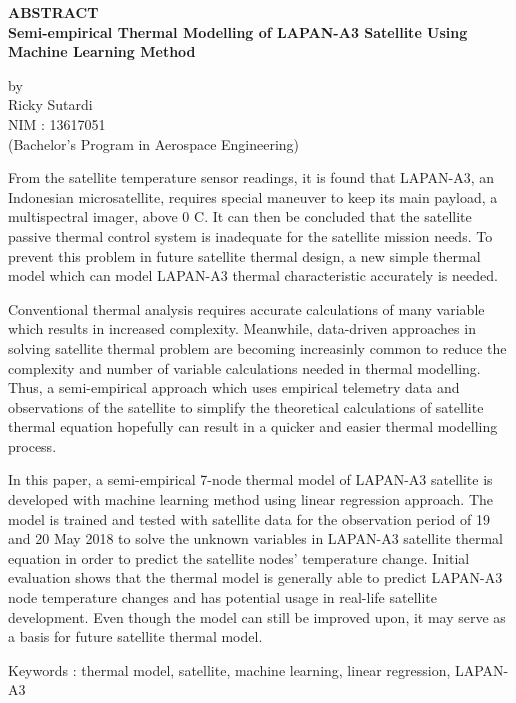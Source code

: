 \begin{center}
       \Large
       \textbf{ABSTRACT} \\
        \vspace{1.5cm}
        \large
        \textbf{Semi-empirical Thermal Modelling of LAPAN-A3 Satellite Using Machine Learning Method}\\
        
        \vspace{1.5cm}
        
        by\\
        Ricky Sutardi\\
        NIM : 13617051\\
        (Bachelor's Program in Aerospace Engineering)\\
        \vspace{1.5cm}
\end{center}

From the satellite temperature sensor readings, it is found that LAPAN-A3, an
Indonesian microsatellite, requires special maneuver to keep its main payload,
a multispectral imager, above 0 \degree C. It can then be concluded that the
satellite passive thermal control system is inadequate for the satellite
mission needs. To prevent this problem in future satellite thermal design, a
new simple thermal model which can model LAPAN-A3 thermal characteristic
accurately is needed.

Conventional thermal analysis requires accurate calculations of many variable
which results in increased complexity. Meanwhile, data-driven approaches in
solving satellite thermal problem are becoming increasinly common to reduce the
complexity and number of variable calculations needed in thermal modelling.
Thus, a semi-empirical approach which uses empirical telemetry data and
observations of the satellite to simplify the theoretical calculations of
satellite thermal equation hopefully can result in a quicker and easier thermal
modelling process.

In this paper, a semi-empirical 7-node thermal model of LAPAN-A3 satellite is
developed with machine learning method using linear regression approach. The
model is trained and tested with satellite data for the observation period of
19 and 20 May 2018 to solve the unknown variables in LAPAN-A3 satellite thermal
equation in order to predict the satellite nodes' temperature change. Initial
evaluation shows that the thermal model is generally able to predict LAPAN-A3
node temperature changes and has potential usage in real-life satellite
development. Even though the model can still be improved upon, it may serve as
a basis for future satellite thermal model.

\vspace{1.0cm}
\noindent 
Keywords : thermal model, satellite, machine learning, linear regression, LAPAN-A3 
